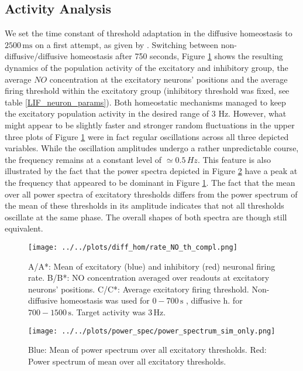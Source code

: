 \documentclass[10pt,a4paper]{article}
\begin{document}
\subsection{Activity Analysis} \label{activ_analys}
We set the time constant of threshold adaptation in the diffusive homeostasis to $\mathrm{2500\, ms}$ on a first attempt, as given by \cite{Sweeney_Paper}. Switching between non-diffusive/diffusive homeostasis after 750 seconds, Figure \ref{full_sim_osci} shows the resulting dynamics of the population activity of the excitatory and inhibitory group, the average $NO$ concentration at the excitatory neurons' positions and the average firing threshold within the excitatory group (inhibitory threshold was fixed, see table \ref{LIF_neuron_params}). Both homeostatic mechanisms managed to keep the excitatory population activity in the desired range of 3 Hz. However, what might appear to be slightly faster and stronger random fluctuations in the upper three plots of Figure \ref{full_sim_osci} were in fact regular oscillations across all three depicted variables. While the oscillation amplitudes undergo a rather unpredictable course, the frequency remains at a constant level of $\simeq 0.5\, Hz$. This feature is also illustrated by the fact that the power spectra depicted in Figure \ref{Power_Spec_without_Analysis} have a peak at the frequency that appeared to be dominant in Figure \ref{full_sim_osci}. The fact that the mean over all power spectra of excitatory thresholds differs from the power spectrum of the mean of these thresholds in its amplitude indicates that not all thresholds oscillate at the same phase. The overall shapes of both spectra are though still equivalent.
\begin{figure}
\begin{center}
\texttt{[image: ../../plots/diff\_hom/rate\_NO\_th\_compl.png]}
\end{center}
\caption{A/A*: Mean of excitatory (blue) and inhibitory (red) neuronal firing rate. B/B*: NO concentration averaged over readouts at excitatory neurons' positions. C/C*: Average excitatory firing threshold. Non-diffusive homeostasis was used for $\mathrm{0-700\, s}$ , diffusive h. for $\mathrm{700-1500\, s}$. Target activity was $\mathrm{3\, Hz}$.}
\label{full_sim_osci}
\end{figure}
\begin{figure}
\begin{center}
\texttt{[image: ../../plots/power\_spec/power\_spectrum\_sim\_only.png]}
\caption{Blue: Mean of power spectrum over all excitatory thresholds. Red: Power spectrum of mean over all excitatory thresholds.}
\label{Power_Spec_without_Analysis}
\end{center}
\end{figure}
\end{document}
